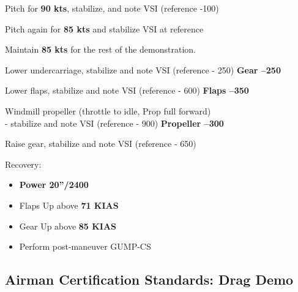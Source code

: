 {Pitch for \textbf{90 kts}, stabilize, and note VSI (reference -100)

Pitch again for \textbf{85 kts} and stabilize VSI at reference

Maintain \textbf{85 kts} for the rest of the demonstration.

Lower undercarriage, stabilize and note VSI (reference - 250) \textbf{Gear –250}

Lower flaps, stabilize and note VSI (reference - 600) \textbf{Flaps –350}

Windmill propeller (throttle to idle, Prop full forward)\\
- stabilize and note VSI (reference - 900) \textbf{Propeller –300}

Raise gear, stabilize and note VSI (reference - 650)

Recovery:
\begin{itemize}[label={}]

\item \textbf{Power 20''/2400}
\item Flaps Up above \textbf{71 KIAS}
\item Gear Up above \textbf{85 KIAS}
\item Perform post-maneuver GUMP-CS
\end{itemize}

\subsection{Airman Certification Standards: Drag Demo}


}
